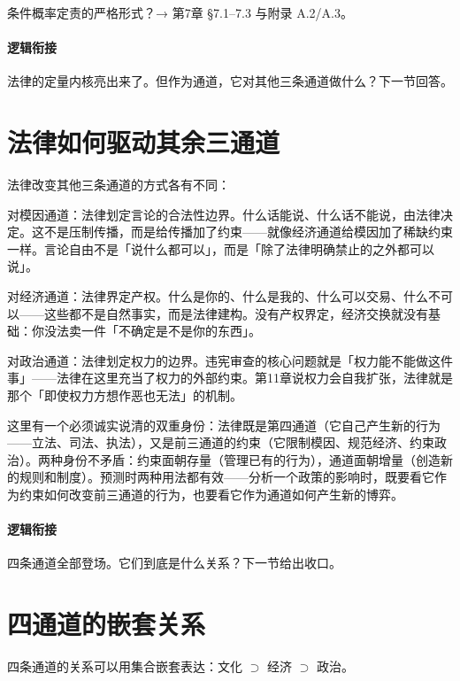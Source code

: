 \documentclass[../../main2.tex]{subfiles}
\begin{document}
	\begin{reader_anticipation}
		\item 条件概率定责的严格形式？→ 第7章 §7.1--7.3 与附录 A.2/A.3。
	\end{reader_anticipation}

	\paragraph*{逻辑衔接}
	法律的定量内核亮出来了。但作为通道，它对其他三条通道做什么？下一节回答。
	\section{法律如何驱动其余三通道}
	\label{sec:law-drives}
	法律改变其他三条通道的方式各有不同：

	对模因通道：法律划定言论的合法性边界。什么话能说、什么话不能说，由法律决定。这不是压制传播，而是给传播加了约束——就像经济通道给模因加了稀缺约束一样。言论自由不是「说什么都可以」，而是「除了法律明确禁止的之外都可以说」。

	对经济通道：法律界定产权。什么是你的、什么是我的、什么可以交易、什么不可以——这些都不是自然事实，而是法律建构。没有产权界定，经济交换就没有基础：你没法卖一件「不确定是不是你的东西」。

	对政治通道：法律划定权力的边界。违宪审查的核心问题就是「权力能不能做这件事」——法律在这里充当了权力的外部约束。第11章说权力会自我扩张，法律就是那个「即使权力方想作恶也无法」的机制。

	这里有一个必须诚实说清的双重身份：法律既是第四通道（它自己产生新的行为——立法、司法、执法），又是前三通道的约束（它限制模因、规范经济、约束政治）。两种身份不矛盾：约束面朝存量（管理已有的行为），通道面朝增量（创造新的规则和制度）。预测时两种用法都有效——分析一个政策的影响时，既要看它作为约束如何改变前三通道的行为，也要看它作为通道如何产生新的博弈。

	\paragraph*{逻辑衔接}
	四条通道全部登场。它们到底是什么关系？下一节给出收口。
	\section{四通道的嵌套关系}
	\label{sec:law-nesting}
	四条通道的关系可以用集合嵌套表达：文化 $\supset$ 经济 $\supset$ 政治。
\end{document}

